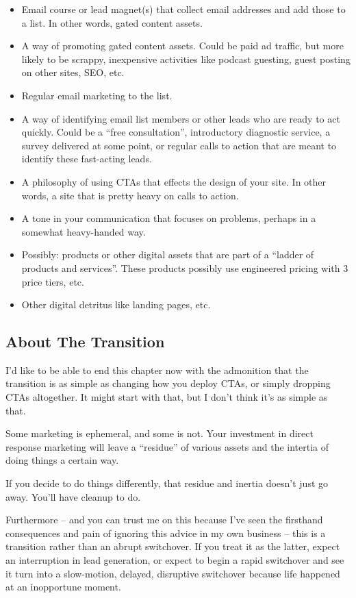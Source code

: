 \documentclass[13pt,]{tufte-handout}
\providecommand{\tightlist}{%
  \setlength{\itemsep}{0pt}\setlength{\parskip}{0pt}}
\begin{document}
\begin{itemize}
\tightlist
\item
  Email course or lead magnet(s) that collect email addresses and add
  those to a list. In other words, gated content assets.
\item
  A way of promoting gated content assets. Could be paid ad traffic, but
  more likely to be scrappy, inexpensive activities like podcast
  guesting, guest posting on other sites, SEO, etc.
\item
  Regular email marketing to the list.
\item
  A way of identifying email list members or other leads who are ready
  to act quickly. Could be a ``free consultation'', introductory
  diagnostic service, a survey delivered at some point, or regular calls
  to action that are meant to identify these fast-acting leads.
\item
  A philosophy of using CTAs that effects the design of your site. In
  other words, a site that is pretty heavy on calls to action.
\item
  A tone in your communication that focuses on problems, perhaps in a
  somewhat heavy-handed way.
\item
  Possibly: products or other digital assets that are part of a ``ladder
  of products and services''. These products possibly use engineered
  pricing with 3 price tiers, etc.
\item
  Other digital detritus like landing pages, etc.
\end{itemize}

\hypertarget{about-the-transition}{%
\subsection{About The Transition}\label{about-the-transition}}

I'd like to be able to end this chapter now with the admonition that the
transition is as simple as changing how you deploy CTAs, or simply
dropping CTAs altogether. It might start with that, but I don't think
it's as simple as that.

Some marketing is ephemeral, and some is not. Your investment in direct
response marketing will leave a ``residue'' of various assets and the
intertia of doing things a certain way.

If you decide to do things differently, that residue and inertia doesn't
just go away. You'll have cleanup to do.

Furthermore -- and you can trust me on this because I've seen the
firsthand consequences and pain of ignoring this advice in my own
business -- this is a transition rather than an abrupt switchover. If
you treat it as the latter, expect an interruption in lead generation,
or expect to begin a rapid switchover and see it turn into a
slow-motion, delayed, disruptive switchover because life happened at an
inopportune moment.
\end{document}

